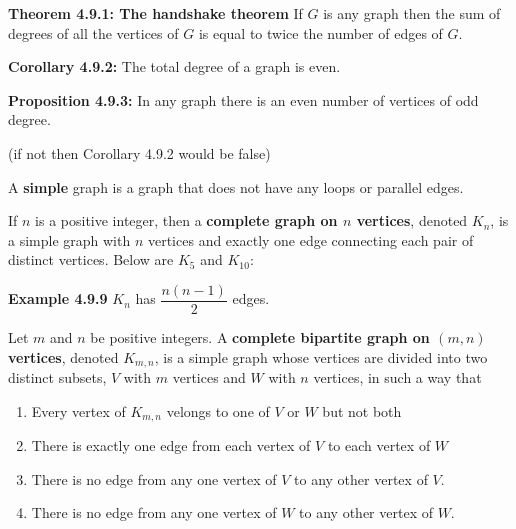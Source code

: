 \documentclass[11pt]{article}
\begin{document}
\bigskip
{\bf Theorem 4.9.1: The handshake theorem} If $G$ is any graph then the sum of 
degrees of all the vertices of $G$ is equal to twice the number of edges of $G$. 

\bigskip
{\bf Corollary 4.9.2:} The total degree of a graph is even. 

\bigskip
{\bf Proposition 4.9.3:} In any graph there is an even number of vertices of 
odd degree. 

(if not then Corollary 4.9.2 would be false)

\bigskip
A {\bf simple} graph is a graph that does not have any loops or parallel edges. 

\bigskip
If $n$ is a positive integer, then a {\bf complete graph on $n$ vertices}, 
denoted $K_n$, is a simple graph with $n$ vertices and exactly one edge 
connecting each pair of distinct vertices. Below are $K_5$ and $K_{10}$:

\begin{center}
\end{center}


\begin{center}
\end{center}

{\bf Example 4.9.9} $K_n$ has $\dfrac{n(n-1)}{2}$ edges. 

\bigskip
Let $m$ and $n$ be positive integers. A {\bf complete bipartite graph on $(m,n)$ 
vertices}, denoted $K_{m, n}$, is a simple graph whose vertices are divided 
into two distinct subsets, $V$ with $m$ vertices and $W$ with $n$ vertices, 
in such a way that 
\begin{enumerate}
    \item Every vertex of $K_{m,n}$ velongs to one of $V$ or $W$ but not both
    \item There is exactly one edge from each vertex of $V$ to each vertex of $W$
    \item There is no edge from any one vertex of $V$ to any other vertex of $V$. 
    \item There is no edge from any one vertex of $W$ to any other vertex of $W$. 
\end{enumerate}
\end{document}
